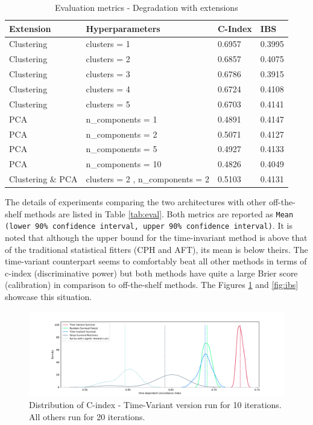 \documentclass[%
 reprint,
 amsmath,amssymb,
 aps,nofootinbib
]{revtex4-2}
\begin{document}
\begin{table}[H]
  \centering
  \begin{tabular}{|p{2cm}|p{3cm}|p{1.4cm}|p{1cm}|}
     \hline
    \textbf{Extension} & \textbf{Hyperparameters} & \textbf{C-Index} & \textbf{IBS} \\
    \hline
    Clustering & clusters = 1 & 0.6957 & 0.3995 \\
    \hline
    Clustering & clusters = 2 & 0.6857 & 0.4075 \\
    \hline
    Clustering & clusters = 3 & 0.6786 & 0.3915 \\
    \hline
    Clustering & clusters = 4 & 0.6724 & 0.4108 \\
    \hline
    Clustering & clusters = 5 & 0.6703 & 0.4141 \\
    \hline
    PCA & n\_components = 1 & 0.4891 & 0.4147\\
    \hline
    PCA & n\_components = 2 & 0.5071 & 0.4127\\
    \hline
    PCA & n\_components = 5 & 0.4927 &  0.4133\\
    \hline
    PCA & n\_components = 10 & 0.4826 & 0.4049\\
    \hline
    Clustering \& PCA & clusters = 2 , n\_components = 2& 0.5103 & 0.4131\\
    \hline
  \end{tabular}
  \caption{Evaluation metrics - Degradation with extensions}
  \label{tab:eval_degrad}
\end{table}

The details of experiments comparing the two architectures with other off-the-shelf methods are listed in Table \ref{tab:eval}. Both metrics are reported as \texttt{Mean (lower 90\% confidence interval, upper 90\% confidence interval)}. It is noted that although the upper bound for the time-invariant method is above that of the traditional statistical fitters (CPH and AFT), its mean is below theirs. The time-variant counterpart seems to comfortably beat all other methods in terms of c-index (discriminative power) but both methods have quite a large Brier score (calibration) in comparison to off-the-shelf methods. The Figures \ref{fig:cindex} and \ref{fig:ibs} showcase this situation.\\


\begin{figure}
  \centering
  \includegraphics[width=\textwidth]{cindex_score_dist_plot.pdf}
  \caption{Distribution of C-index - Time-Variant version run for 10 iterations. All others run for 20 iterations.}
  \label{fig:cindex}
\end{figure}
\end{document}
